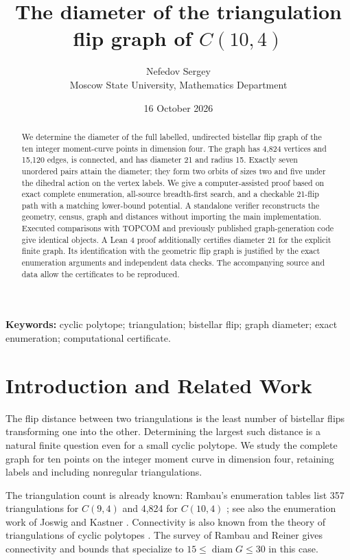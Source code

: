 \documentclass[11pt]{article}
\title{The diameter of the triangulation flip graph of $C(10,4)$}
\author{Nefedov Sergey\\
\small Moscow State University, Mathematics Department}
\date{16 October 2026}
\newcommand{\diam}{\operatorname{diam}}
\begin{document}
\maketitle
\begin{abstract}
We determine the diameter of the full labelled, undirected bistellar flip graph
of the ten integer moment-curve points in dimension four. The graph has 4,824
vertices and 15,120 edges, is connected, and has diameter 21 and radius 15.
Exactly seven unordered pairs attain the diameter; they form two orbits of
sizes two and five under the dihedral action on the vertex labels. We give a
computer-assisted proof based on exact complete enumeration, all-source
breadth-first search, and a checkable 21-flip path with a matching lower-bound
potential. A standalone verifier reconstructs the geometry, census, graph and
distances without importing the main implementation. Executed comparisons with
TOPCOM and previously published graph-generation code give identical objects.
A Lean 4 proof additionally certifies diameter 21 for the explicit finite graph. Its identification with the geometric flip graph is justified by the exact enumeration arguments and independent data checks. The accompanying source and data allow the certificates to be reproduced.
\end{abstract}
\noindent\textbf{Keywords:} cyclic polytope; triangulation; bistellar flip;
graph diameter; exact enumeration; computational certificate.

\section{Introduction and Related Work}
The flip distance between two triangulations is the least number of bistellar
flips transforming one into the other. Determining the largest such distance
is a natural finite question even for a small cyclic polytope. We study the
complete graph for ten points on the integer moment curve in dimension four,
retaining labels and including nonregular triangulations.

The triangulation count is already known: Rambau's enumeration tables list
357 triangulations for $C(9,4)$ and 4,824 for $C(10,4)$
\cite[Table 7]{rambau2026}; see also the enumeration work of Joswig and
Kastner \cite{joswig}. Connectivity is also known from the theory of
triangulations of cyclic polytopes \cite{rambau1997}. The survey of Rambau and
Reiner \cite[Theorem 6.5 and Corollary 6.9]{survey} gives connectivity and
bounds that specialize to $15\leq\diam G\leq30$ in this case.
\end{document}

